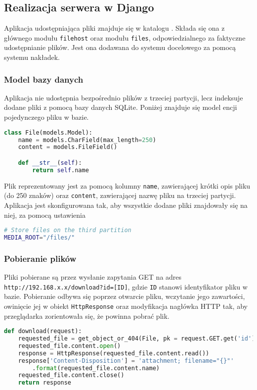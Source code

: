 \documentclass[10pt,a4paper]{article}
\begin{document}
\subsection{Realizacja serwera w Django}

Aplikacja udostępniająca pliki znajduje się w katalogu
.
Składa się ona z głównego modułu \texttt{filehost} oraz modułu \texttt{files},
odpowiedzialnego za faktyczne udostępnianie plików. Jest ona dodawana do systemu docelowego
za pomocą systemu nakładek.

\subsubsection{Model bazy danych}

Aplikacja nie udostępnia bezpośrednio plików z trzeciej partycji, lecz indeksuje dodane pliki
z pomocą bazy danych SQLite. Poniżej znajduje się model encji pojedynczego pliku w bazie.

\begin{lstlisting}[language=python,caption=Model encji \texttt{File}]
class File(models.Model):
    name = models.CharField(max_length=250)
    content = models.FileField()

    def __str__(self):
        return self.name
\end{lstlisting}

Plik reprezentowany jest za pomocą kolumny \texttt{name}, zawierającej krótki opis pliku (do 250
znaków) oraz \texttt{content}, zawierającej nazwę pliku na trzeciej partycji. Aplikacja jest
skonfigurowana tak, aby wszystkie dodane pliki znajdowały się na niej, za pomocą ustawienia
\begin{lstlisting}[language=bash,caption=Opcja w \directory{filehost/settings.py} ustawiająca lokalizację dodanych plików]
# Store files on the third partition
MEDIA_ROOT="/files/"
\end{lstlisting}

\subsubsection{Pobieranie plików}

Pliki pobierane są przez wysłanie zapytania GET na adres \texttt{http://192.168.x.x/download?id=[ID]},
gdzie \texttt{ID} stanowi identyfikator pliku w bazie. Pobieranie odbywa się poprzez otwarcie pliku,
wczytanie jego zawartości, owinięcie jej w obiekt \texttt{HttpResponse} oraz modyfikacja
nagłówka HTTP tak, aby przeglądarka zorientowała się, że powinna pobrać plik.
\begin{lstlisting}[language=python,caption=Widok w \directory{files/views.py} odpowiadający za pobieranie plików]
def download(request):
    requested_file = get_object_or_404(File, pk = request.GET.get('id'))
    requested_file.content.open()
    response = HttpResponse(requested_file.content.read())
    response['Content-Disposition'] = 'attachment; filename="{}"'
    	.format(requested_file.content.name)
    requested_file.content.close()
    return response
\end{lstlisting}
\end{document}
